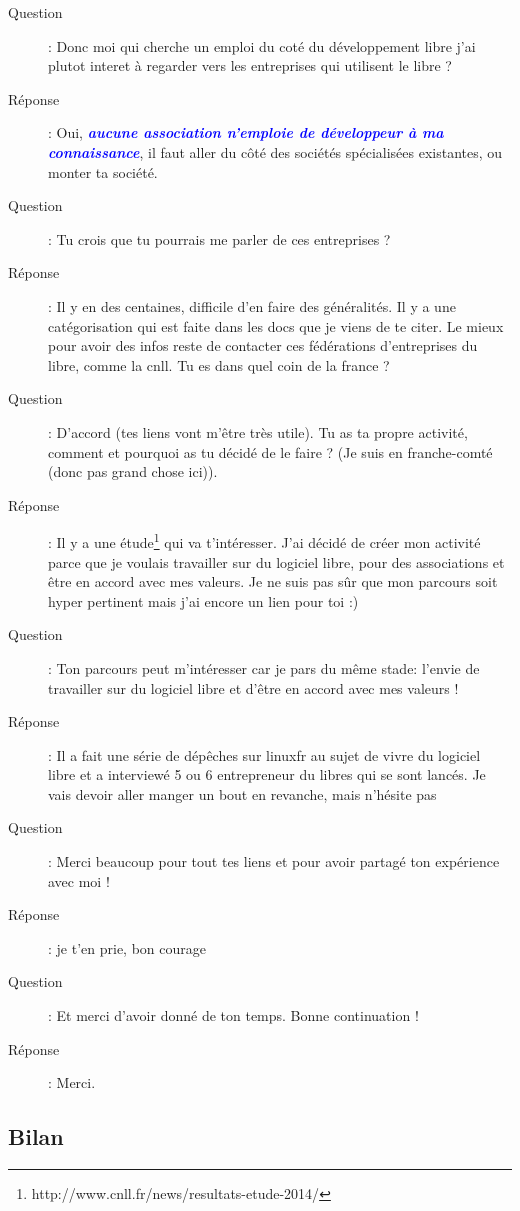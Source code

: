 \documentclass[a4paper,12pt, draft]{report}
\newcommand{\importantPoint}[1]{\textcolor{blue}{\textbf{\textit{#1}}}}
\begin{document}
\begin{description}
\item [Question]:  Donc moi qui cherche un emploi du coté du développement libre j'ai plutot interet à regarder vers les entreprises qui utilisent le libre ?
\item [Réponse]:  Oui, \importantPoint{aucune association n'emploie de développeur à ma connaissance}, il faut aller du côté des sociétés spécialisées existantes, ou monter ta société.
\item [Question]:  Tu crois que tu pourrais me parler de ces entreprises ?
\item [Réponse]:  Il y en des centaines, difficile d'en faire des généralités. Il y a une catégorisation qui est faite dans les docs que je viens de te citer. Le mieux pour avoir des infos reste de contacter ces fédérations d'entreprises du libre, comme la cnll. Tu es dans quel coin de la france ?
\item [Question]:  D'accord (tes liens vont m'être très utile). Tu as ta propre activité, comment et  pourquoi as tu décidé de le faire ? (Je suis en franche-comté (donc pas grand chose ici)).
\item [Réponse]:  Il y a une étude\footnote{http://www.cnll.fr/news/resultats-etude-2014/} qui va t'intéresser. J'ai décidé de créer mon activité parce que je voulais travailler sur du logiciel libre, pour des associations et être en accord avec mes valeurs. Je ne suis pas sûr que mon parcours soit hyper pertinent mais j'ai encore un lien\cite{linuxfr_new} pour toi :)
\item [Question]:  Ton parcours peut m'intéresser car je pars du même stade: l'envie de travailler sur du logiciel libre et d'être en accord avec mes valeurs !
\item [Réponse]:  Il a fait une série de dépêches sur linuxfr au sujet de vivre du logiciel libre et a interviewé 5 ou 6 entrepreneur du libres qui se sont lancés. Je vais devoir aller manger un bout en revanche, mais n'hésite pas
\item [Question]:  Merci beaucoup pour tout tes liens et pour avoir partagé ton expérience avec moi !
\item [Réponse]:  je t'en prie, bon courage
\item [Question]:  Et merci d'avoir donné de ton temps. Bonne continuation !
\item [Réponse]:  Merci.
\end{description}
\newpage
\subsection{Bilan}
\end{document}
